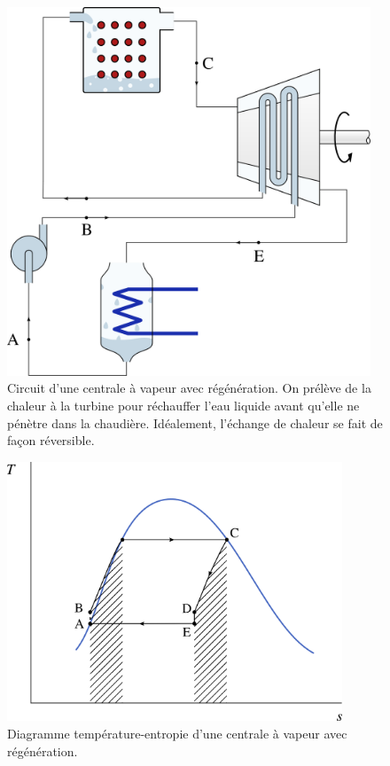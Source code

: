 		\begin{figure}
			\begin{center}
				\includegraphics[height=11cm]{images/circuit_regeneration.png}
			\end{center}
			\caption{Circuit d’une centrale à vapeur avec régénération. On prélève de la chaleur à la turbine pour réchauffer l’eau liquide avant qu’elle ne pénètre dans la chaudière. Idéalement, l’échange de chaleur se fait de façon réversible.}
			\label{fig_circuit_regeneration}
		\end{figure}

		\begin{figure}
			\begin{center}
				\includegraphics[width=10cm]{images/ts_lv_regeneration.png}
			\end{center}
			\caption{Diagramme température-entropie d’une centrale à vapeur avec régénération.}
			\label{fig_ts_lv_regeneration}
		\end{figure}


